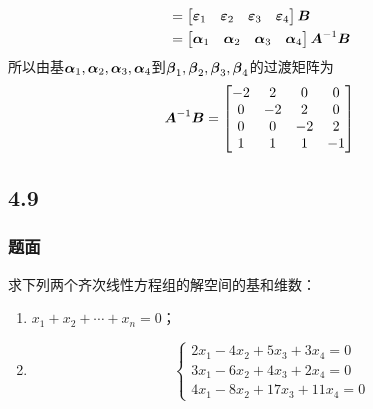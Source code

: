 \documentclass{beamer}
\begin{document}
\begin{frame}[allowframebreaks]
\begin{enumerate}
{\begin{align*}
                   & =\begin{bmatrix}\boldsymbol{\varepsilon}_1&\boldsymbol{\varepsilon}_2&\boldsymbol{\varepsilon}_3&\boldsymbol{\varepsilon}_4\end{bmatrix}\boldsymbol{B}    \\
                   & =\begin{bmatrix}\boldsymbol{\alpha}_1&\boldsymbol{\alpha}_2&\boldsymbol{\alpha}_3&\boldsymbol{\alpha}_4\end{bmatrix}{\boldsymbol{A}}^{-1}\boldsymbol{B}
              \end{align*}
              所以由基\(\boldsymbol{\alpha}_1,\boldsymbol{\alpha}_2,\boldsymbol{\alpha}_3,\boldsymbol{\alpha}_4\)到\(\boldsymbol{\beta}_1,\boldsymbol{\beta}_2,\boldsymbol{\beta}_3,\boldsymbol{\beta}_4\)的过渡矩阵为
              \begin{equation*}
                  {\boldsymbol{A}}^{-1}\boldsymbol{B}=
                  \begin{bmatrix}
                      -2 & 2  & 0  & 0  \\
                      0  & -2 & 2  & 0  \\
                      0  & 0  & -2 & 2  \\
                      1  & 1  & 1  & -1
                  \end{bmatrix}
              \end{equation*}
              }
    \end{enumerate}
\end{frame}

\subsection*{4.9}
\begin{frame}
    \frametitle{题面}
    求下列两个齐次线性方程组的解空间的基和维数：
    \begin{enumerate}
        \item \(x_1+x_2+\cdots+x_n=0\)；
        \item \begin{equation*}
                  \begin{cases}
                      2x_1-4x_2+5x_3+3x_4=0 \\
                      3x_1-6x_2+4x_3+2x_4=0 \\
                      4x_1-8x_2+17x_3+11x_4=0
                  \end{cases}
              \end{equation*}
    \end{enumerate}
\end{frame}
\end{document}
